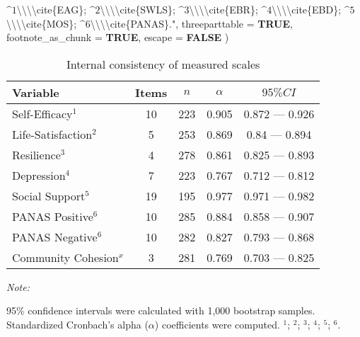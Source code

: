 \documentclass[
  bookmarksnumbered]{article}
\newenvironment{Shaded}{\begin{snugshade}}{\end{snugshade}}
\newcommand{\AttributeTok}[1]{\textcolor[rgb]{0.80,0.80,0.80}{#1}}
\newcommand{\ConstantTok}[1]{\textcolor[rgb]{0.86,0.64,0.64}{\textbf{#1}}}
\newcommand{\NormalTok}[1]{\textcolor[rgb]{0.80,0.80,0.80}{#1}}
\newcommand{\SpecialCharTok}[1]{\textcolor[rgb]{0.86,0.64,0.64}{#1}}
\newcommand{\StringTok}[1]{\textcolor[rgb]{0.80,0.58,0.58}{#1}}
\begin{document}
\begin{Shaded}
\begin{Highlighting}[]
\StringTok{           $\^{}1$}\SpecialCharTok{\textbackslash{}\textbackslash{}\textbackslash{}\textbackslash{}}\StringTok{cite\{EAG\};}
\StringTok{           $\^{}2$}\SpecialCharTok{\textbackslash{}\textbackslash{}\textbackslash{}\textbackslash{}}\StringTok{cite\{SWLS\};}
\StringTok{           $\^{}3$}\SpecialCharTok{\textbackslash{}\textbackslash{}\textbackslash{}\textbackslash{}}\StringTok{cite\{EBR\};}
\StringTok{           $\^{}4$}\SpecialCharTok{\textbackslash{}\textbackslash{}\textbackslash{}\textbackslash{}}\StringTok{cite\{EBD\};}
\StringTok{           $\^{}5$}\SpecialCharTok{\textbackslash{}\textbackslash{}\textbackslash{}\textbackslash{}}\StringTok{cite\{MOS\};}
\StringTok{           $\^{}6$}\SpecialCharTok{\textbackslash{}\textbackslash{}\textbackslash{}\textbackslash{}}\StringTok{cite\{PANAS\}."}\NormalTok{,}
    \AttributeTok{threeparttable =} \ConstantTok{TRUE}\NormalTok{, }\AttributeTok{footnote\_as\_chunk =} \ConstantTok{TRUE}\NormalTok{, }\AttributeTok{escape =} \ConstantTok{FALSE}
\NormalTok{  )}
\end{Highlighting}
\end{Shaded}

\begin{table}[H]
\centering
\caption{\label{tab:tab-cronbach-alpha}Internal consistency of measured scales}
\centering
\begin{threeparttable}
\begin{tabular}[t]{lcccc}
\toprule
Variable & Items & $n$ & $\alpha$ & $95\% CI$\\
\midrule
Self-Efficacy$^1$ & 10 & 223 & 0.905 & 0.872 — 0.926\\
Life-Satisfaction$^2$ & 5 & 253 & 0.869 & 0.84 — 0.894\\
Resilience$^3$ & 4 & 278 & 0.861 & 0.825 — 0.893\\
Depression$^4$ & 7 & 223 & 0.767 & 0.712 — 0.812\\
Social Support$^5$ & 19 & 195 & 0.977 & 0.971 — 0.982\\
PANAS Positive$^6$ & 10 & 285 & 0.884 & 0.858 — 0.907\\
PANAS Negative$^6$ & 10 & 282 & 0.827 & 0.793 — 0.868\\
Community Cohesion$^x$ & 3 & 281 & 0.769 & 0.703 — 0.825\\
\bottomrule
\end{tabular}
\begin{tablenotes}[para]
\item \textit{Note: } 
\item 95\% confidence intervals were calculated with 1,000 bootstrap samples.
           Standardized Cronbach's alpha ($\alpha$) coefficients were computed.
           $^1$\cite{EAG};
           $^2$\cite{SWLS};
           $^3$\cite{EBR};
           $^4$\cite{EBD};
           $^5$\cite{MOS};
           $^6$\cite{PANAS}.
\end{tablenotes}
\end{threeparttable}
\end{table}
\end{document}
